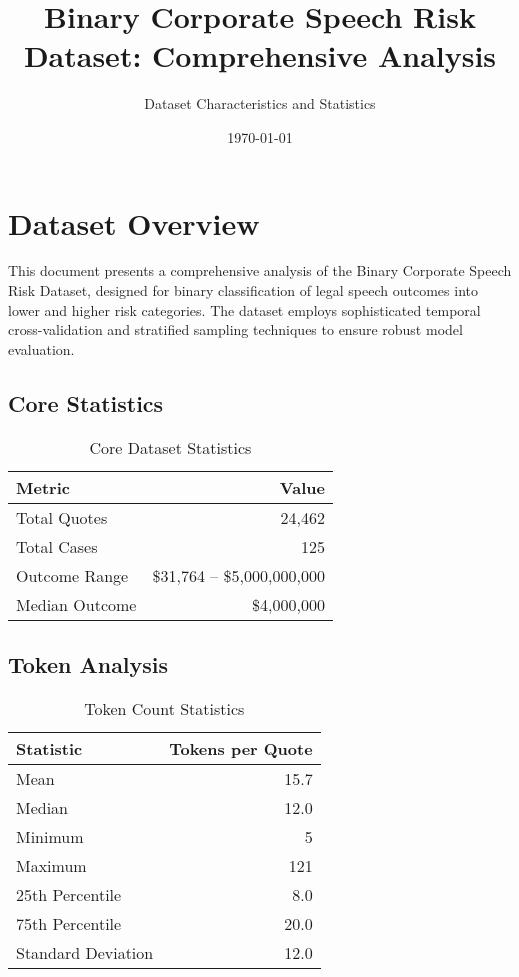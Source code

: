 \documentclass[11pt,a4paper]{article}
\title{Binary Corporate Speech Risk Dataset: Comprehensive Analysis}
\author{Dataset Characteristics and Statistics}
\date{\today}
\begin{document}
\maketitle

\section{Dataset Overview}

This document presents a comprehensive analysis of the Binary Corporate Speech Risk Dataset, designed for binary classification of legal speech outcomes into lower and higher risk categories. The dataset employs sophisticated temporal cross-validation and stratified sampling techniques to ensure robust model evaluation.

\subsection{Core Statistics}


\begin{table}[H]
\centering
\caption{Core Dataset Statistics}
\begin{tabular}{lr}
\toprule
\textbf{Metric} & \textbf{Value} \\
\midrule
Total Quotes & 24,462 \\
Total Cases & 125 \\
Outcome Range & \$31,764 -- \$5,000,000,000 \\
Median Outcome & \$4,000,000 \\
\bottomrule
\end{tabular}
\end{table}

\subsection{Token Analysis}

\begin{table}[H]
\centering
\caption{Token Count Statistics}
\begin{tabular}{lr}
\toprule
\textbf{Statistic} & \textbf{Tokens per Quote} \\
\midrule
Mean & 15.7 \\
Median & 12.0 \\
Minimum & 5 \\
Maximum & 121 \\
25th Percentile & 8.0 \\
75th Percentile & 20.0 \\
Standard Deviation & 12.0 \\
\bottomrule
\end{tabular}
\end{table}
\end{document}
